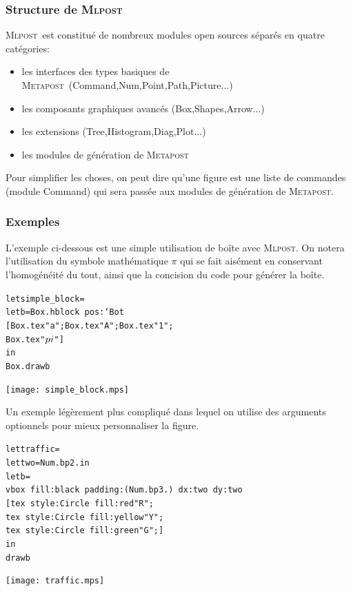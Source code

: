 \documentclass[a4paper,12pt]{article}
\newcommand{\mlpost}{\textsc{Mlpost}}
\newcommand{\meta}{\textsc{Metapost}}
\begin{document}
\subsubsection{Structure de \mlpost}
\mlpost\ est constitué de nombreux modules open sources séparés en quatre catégories:
\begin{itemize}
\item les interfaces des types basiques de \meta\ (Command,Num,Point,Path,Picture...)
\item les composants graphiques avancés (Box,Shapes,Arrow...) 
\item les extensions (Tree,Histogram,Diag,Plot...)
\item les modules de génération de \meta
\end{itemize}

Pour simplifier les choses, on peut dire qu'une figure est une liste de commandes (module Command) qui sera passée aux modules de génération de \meta.


\subsubsection{Exemples}
L'exemple ci-dessous est une simple utilisation de boîte avec \mlpost. On notera l'utilisation du symbole mathématique $\pi$ qui se fait aisément en conservant l'homogénéité du tout, ainsi que la concision du code pour générer la boîte.
\bigskip 

\begin{minipage}{0.7\linewidth}
  \begin{alltt}
    let simple_block =
    let b = Box.hblock ~pos:`Bot 
    [Box.tex "a"; Box.tex "A"; Box.tex "1"; 
     Box.tex "$\\pi$"] 
    in
    Box.draw b
  \end{alltt}
\end{minipage}
\begin{minipage}{0.3\linewidth}
  \begin{center}
    \texttt{[image: simple\_block.mps]}
  \end{center}
\end{minipage}


Un exemple légèrement plus compliqué dans lequel on utilise des arguments optionnels pour mieux personnaliser la figure.
\bigskip 

\begin{minipage}{0.7\linewidth}
  \begin{alltt}
    let traffic =
    let two = Num.bp 2. in
    let b = 
    vbox ~fill:black ~padding:(Num.bp 3.) ~dx:two ~dy:two
    [ tex ~style:Circle ~fill:red "R";
      tex ~style:Circle ~fill:yellow "Y";
      tex ~style:Circle ~fill:green "G"; ]
    in
    draw b
  \end{alltt}
\end{minipage}
\begin{minipage}{0.3\linewidth}
  \begin{center}
    \texttt{[image: traffic.mps]}
  \end{center}
\end{minipage}
\end{document}
